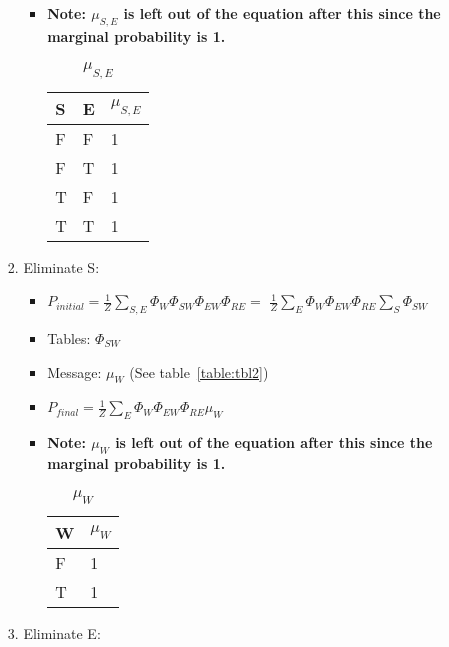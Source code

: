 \documentclass{article}
\begin{document}
\begin{enumerate}[label=(\alph*)]
\begin{enumerate}[label=\roman*.]
\begin{enumerate}[label=\alph*.]
\begin{itemize}
\item \textbf{Note:  $\mu_{S,E}$ is left out of the equation after this since the marginal probability is 1.}

\begin{table}[h]
\centering
\caption{$\mu_{S,E}$}
\label{table:tbl10}
\begin{tabular}{|l|l|l|}
\hline
 S & E & $\mu_{S,E}$   \\
\hline \hline
 F & F & 1  \\
 F & T & 1  \\
 T & F & 1  \\
 T & T & 1 \\
\hline
\end{tabular}
\end{table}

\end{itemize}

\item Eliminate S:

\begin{itemize}

\item $P_{initial}=\frac{1}{Z}\sum_{S,E}\Phi_{W}\Phi_{SW}\Phi_{EW}\Phi_{RE}=$
$\frac{1}{Z}\sum_{E}\Phi_{W}\Phi_{EW}\Phi_{RE}\sum_S\Phi_{SW}$ 

\item Tables: $\Phi_{SW}$

\item Message: $\mu_{W}$ (See table~\ref{table:tbl2})

\item $P_{final}=\frac{1}{Z}\sum_{E}\Phi_{W}\Phi_{EW}\Phi_{RE}\mu_W$

\item \textbf{Note:  $\mu_{W}$ is left out of the equation after this since the marginal probability is 1.}

\begin{table}[h]
\centering
\caption{$\mu_{W}$}
\label{table:tbl11}
\begin{tabular}{|l|l|}
\hline
 W & $\mu_{W}$   \\
\hline \hline
 F & 1  \\
 T & 1  \\
\hline
\end{tabular}
\end{table}

\end{itemize}

\item Eliminate E:


\end{enumerate}
\end{enumerate}
\end{enumerate}
\end{document}

